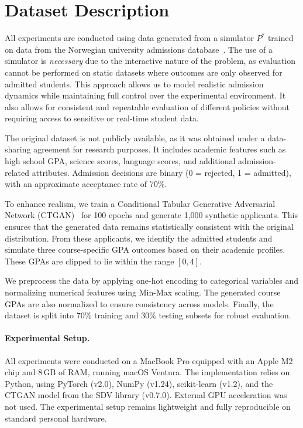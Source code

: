 \documentclass[acmlarge]{acmart-ecaf}
\begin{document}
\appendix

\appendix

\section{Dataset Description}

All experiments are conducted using data generated from a simulator $P^*$ trained on data from the Norwegian university admissions database~\cite{kleine2022meritocracy}. The use of a simulator is \emph{necessary} due to the interactive nature of the problem, as evaluation cannot be performed on static datasets where outcomes are only observed for admitted students. This approach allows us to model realistic admission dynamics while maintaining full control over the experimental environment. It also allows for consistent and repeatable evaluation of different policies without requiring access to sensitive or real-time student data.

The original dataset is not publicly available, as it was obtained under a data-sharing agreement for research purposes. It includes academic features such as high school GPA, science scores, language scores, and additional admission-related attributes. Admission decisions are binary (0 = rejected, 1 = admitted), with an approximate acceptance rate of 70\%.

To enhance realism, we train a Conditional Tabular Generative Adversarial Network (CTGAN)~\cite{xu2019modeling} for 100 epochs and generate 1,000 synthetic applicants. This ensures that the generated data remains statistically consistent with the original distribution. From these applicants, we identify the admitted students and simulate three course-specific GPA outcomes based on their academic profiles. These GPAs are clipped to lie within the range $[0,4]$.

We preprocess the data by applying one-hot encoding to categorical variables and normalizing numerical features using Min-Max scaling. The generated course GPAs are also normalized to ensure consistency across models. Finally, the dataset is split into 70\% training and 30\% testing subsets for robust evaluation.

\paragraph{Experimental Setup.} All experiments were conducted on a MacBook Pro equipped with an Apple M2 chip and 8\,GB of RAM, running macOS Ventura. The implementation relies on Python, using PyTorch (v2.0), NumPy (v1.24), scikit-learn (v1.2), and the CTGAN model from the SDV library (v0.7.0). External GPU acceleration was not used. The experimental setup remains lightweight and fully reproducible on standard personal hardware.
 
\end{document}
